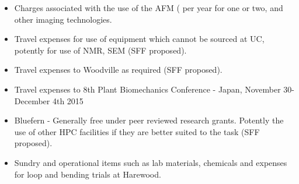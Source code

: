 \begin{itemize}
\item Charges associated with the use of the AFM ( per year for one or two, and other imaging technologies.
\end{itemize}

\begin{itemize}
\item Travel expenses for use of equipment which cannot be sourced at UC, potently for
use of NMR, SEM (SFF proposed).
\end{itemize}

\begin{itemize}
\item Travel expenses to Woodville as required (SFF proposed).
\end{itemize}
\begin{itemize}
\item Travel expenses to 8th Plant Biomechanics Conference - Japan, November
30-December 4th 2015
\end{itemize}

\begin{itemize}
\item Bluefern - Generally free under peer reviewed research grants. Potently the use
of other HPC facilities if they are better suited to the task (SFF proposed).
\end{itemize}

\begin{itemize}
\item Sundry and operational items such as lab materials, chemicals and expenses for
loop and bending trials at Harewood.
\end{itemize}
